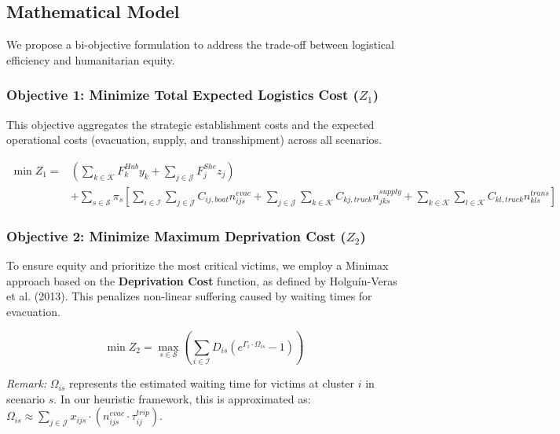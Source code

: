 \subsection*{Mathematical Model}

We propose a bi-objective formulation to address the trade-off between logistical efficiency and humanitarian equity.

\subsubsection{Objective 1: Minimize Total Expected Logistics Cost ($Z_1$)}
This objective aggregates the strategic establishment costs and the expected operational costs (evacuation, supply, and transshipment) across all scenarios.

\begin{equation}
\begin{aligned}
\min Z_1 = & \left( \sum_{k \in \mathcal{K}} F_k^{Hub} y_k + \sum_{j \in \mathcal{J}} F_j^{She} z_j \right) \\
& + \sum_{s \in \mathcal{S}} \pi_s \left[ \sum_{i \in \mathcal{I}} \sum_{j \in \mathcal{J}} C_{ij,boat} n_{ijs}^{evac} + \sum_{j \in \mathcal{J}} \sum_{k \in \mathcal{K}} C_{kj,truck} n_{jks}^{supply} + \sum_{k \in \mathcal{K}} \sum_{l \in \mathcal{K}} C_{kl,truck} n_{kls}^{trans} \right]
\end{aligned}
\end{equation}

\subsubsection{Objective 2: Minimize Maximum Deprivation Cost ($Z_2$)}
To ensure equity and prioritize the most critical victims, we employ a Minimax approach based on the \textbf{Deprivation Cost} function, as defined by Holguín-Veras et al. (2013). This penalizes non-linear suffering caused by waiting times for evacuation.

\begin{equation}
\min Z_2 = \max_{s \in \mathcal{S}} \left( \sum_{i \in \mathcal{I}} D_{is} \left( e^{\Gamma_i \cdot \Omega_{is}} - 1 \right) \right)
\end{equation}

\textit{Remark:} $\Omega_{is}$ represents the estimated waiting time for victims at cluster $i$ in scenario $s$. In our heuristic framework, this is approximated as: $\Omega_{is} \approx \sum_{j \in \mathcal{J}} x_{ijs} \cdot (n_{ijs}^{evac} \cdot \tau_{ij}^{trip})$.

